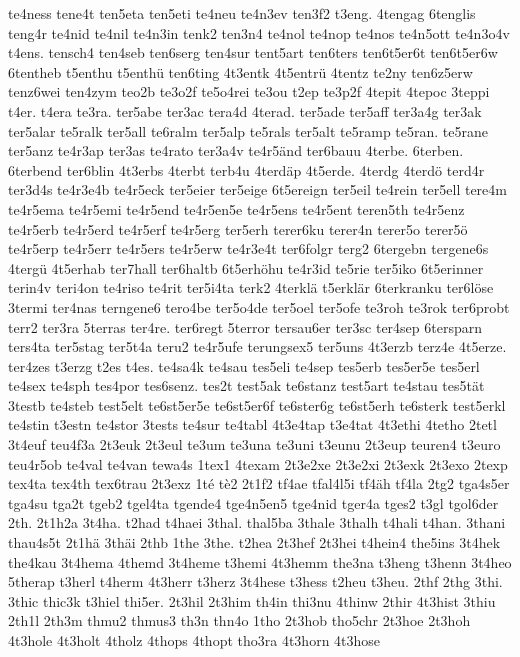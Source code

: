 {te4ness
tene4t
ten5eta
ten5eti
te4neu
te4n3ev
ten3f2
t3eng.
4tengag
6tenglis
teng4r
te4nid
te4nil
te4n3in
tenk2
ten3n4
te4nol
te4nop
te4nos
te4n5ott
te4n3o4v
t4ens.
tensch4
ten4seb
ten6serg
ten4sur
tent5art
ten6ters
ten6t5er6t
ten6t5er6w
6tentheb
t5enthu
t5enthü
ten6ting
4t3entk
4t5entrü
4tentz
te2ny
ten6z5erw
tenz6wei
ten4zym
teo2b
te3o2f
te5o4rei
te3ou
t2ep
te3p2f
4tepit
4tepoc
3teppi
t4er.
t4era
te3ra.
ter5abe
ter3ac
tera4d
4terad.
ter5ade
ter5aff
ter3a4g
ter3ak
ter5alar
te5ralk
ter5all
te6ralm
ter5alp
te5rals
ter5alt
te5ramp
te5ran.
te5rane
ter5anz
te4r3ap
ter3as
te4rato
ter3a4v
te4r5änd
ter6bauu
4terbe.
6terben.
6terbend
ter6blin
4t3erbs
4terbt
terb4u
4terdäp
4t5erde.
4terdg
4terdö
terd4r
ter3d4s
te4r3e4b
te4r5eck
ter5eier
ter5eige
6t5ereign
ter5eil
te4rein
ter5ell
tere4m
te4r5ema
te4r5emi
te4r5end
te4r5en5e
te4r5ens
te4r5ent
teren5th
te4r5enz
te4r5erb
te4r5erd
te4r5erf
te4r5erg
ter5erh
terer6ku
terer4n
terer5o
terer5ö
te4r5erp
te4r5err
te4r5ers
te4r5erw
te4r3e4t
ter6folgr
terg2
6tergebn
tergene6s
4tergü
4t5erhab
ter7hall
ter6haltb
6t5erhöhu
te4r3id
te5rie
ter5iko
6t5erinner
terin4v
teri4on
te4riso
te4rit
ter5i4ta
terk2
4terklä
t5erklär
6terkranku
ter6löse
3termi
ter4nas
terngene6
tero4be
ter5o4de
ter5oel
ter5ofe
te3roh
te3rok
ter6probt
terr2
ter3ra
5terras
ter4re.
ter6regt
5terror
tersau6er
ter3sc
ter4sep
6tersparn
ters4ta
ter5stag
ter5t4a
teru2
te4r5ufe
terungsex5
ter5uns
4t3erzb
terz4e
4t5erze.
ter4zes
t3erzg
t2es
t4es.
te4sa4k
te4sau
tes5eli
te4sep
tes5erb
tes5er5e
tes5erl
te4sex
te4sph
tes4por
tes6senz.
tes2t
test5ak
te6stanz
test5art
te4stau
tes5tät
3testb
te4steb
test5elt
te6st5er5e
te6st5er6f
te6ster6g
te6st5erh
te6sterk
test5erkl
te4stin
t3estn
te4stor
3tests
te4sur
te4tabl
4t3e4tap
t3e4tat
4t3ethi
4tetho
2tetl
3t4euf
teu4f3a
2t3euk
2t3eul
te3um
te3una
te3uni
t3eunu
2t3eup
teuren4
t3euro
teu4r5ob
te4val
te4van
tewa4s
1tex1
4texam
2t3e2xe
2t3e2xi
2t3exk
2t3exo
2texp
tex4ta
tex4th
tex6trau
2t3exz
1té
tè2
2t1f2
tf4ae
tfal4l5i
tf4äh
tf4la
2tg2
tga4s5er
tga4su
tga2t
tgeb2
tgel4ta
tgende4
tge4n5en5
tge4nid
tger4a
tges2
t3gl
tgol6der
2th.
2t1h2a
3t4ha.
t2had
t4haei
3thal.
thal5ba
3thale
3thalh
t4hali
t4han.
3thani
thau4s5t
2t1hä
3thäi
2thb
1the
3the.
t2hea
2t3hef
2t3hei
t4hein4
the5ins
3t4hek
the4kau
3t4hema
4themd
3t4heme
t3hemi
4t3hemm
the3na
t3heng
t3henn
3t4heo
5therap
t3herl
t4herm
4t3herr
t3herz
3t4hese
t3hess
t2heu
t3heu.
2thf
2thg
3thi.
3thic
thic3k
t3hiel
thi5er.
2t3hil
2t3him
th4in
thi3nu
4thinw
2thir
4t3hist
3thiu
2th1l
2th3m
thmu2
thmus3
th3n
thn4o
1tho
2t3hob
tho5chr
2t3hoe
2t3hoh
4t3hole
4t3holt
4tholz
4thops
4thopt
tho3ra
4t3horn
4t3hose
}
